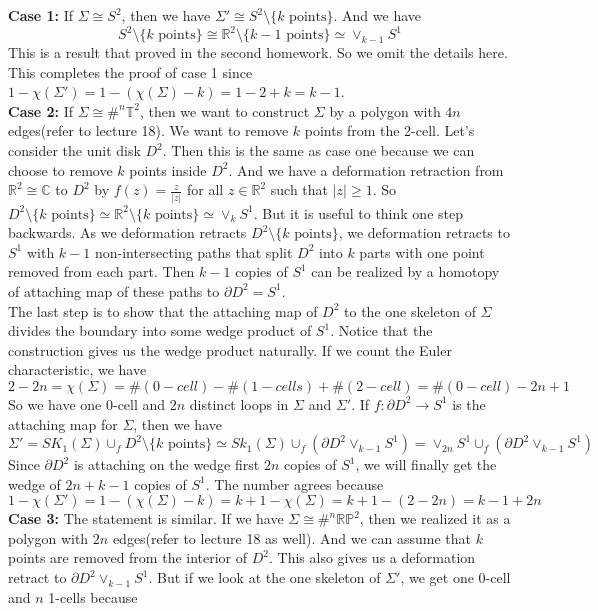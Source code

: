 \documentclass[12pt]{amsart}
\newcommand{\R}{\mathbb{R}}
\newcommand{\C}{\mathbb{C}}
\newcommand{\torus}{\mathbb{T}^2}
\newcommand{\rp}{\mathbb{RP}^2}
\begin{document}
\textbf{Case 1:} If $\Sigma\cong S^2$, then we have $\Sigma'\cong S^2\setminus\{k \text{ points}\}$. And we have 
\[S^2\setminus\{k \text{ points}\}\cong \R^2\setminus\{k-1 \text{ points}\}\simeq \vee_{k-1}S^1\]
This is a result that proved in the second homework. So we omit the details here. This completes the proof of case 1 since $1-\chi(\Sigma')=1-(\chi(\Sigma)-k)=1-2+k=k-1$.\\
\textbf{Case 2:} If $\Sigma \cong\#^n\torus$, then we want to construct $\Sigma$ by a polygon with $4n$ edges(refer to lecture 18). We want to remove $k$ points from the 2-cell. Let's consider the unit disk $D^2$. Then this is the same as case one because we can choose to remove $k$ points inside $D^2$. And we have a deformation retraction from $\R^2\cong \C$ to $D^2$ by $f(z)=\frac{z}{|z|}$ for all $z\in \R^2$ such that $|z|\geq 1$. So $D^2\setminus \{k\text{ points}\}\simeq \R^2\setminus\{k \text{ points}\}\simeq \vee_{k}S^1$. But it is useful to think one step backwards. As we deformation retracts $D^2\setminus \{k\text{ points}\}$, we deformation retracts to $S^1$ with $k-1$ non-intersecting paths that split $D^2$ into $k$ parts with one point removed from each part. Then $k-1$ copies of $S^1$ can be realized by a homotopy of attaching map of these paths to $\partial D^2=S^1$.\\
The last step is to show that the attaching map of $D^2$ to the one skeleton of $\Sigma$ divides the boundary into some wedge product of $S^1$. Notice that the construction gives us the wedge product naturally. If we count the Euler characteristic, we have 
\[2-2n=\chi(\Sigma)=\#(0-cell)-\#(1-cells)+\#(2-cell)=\#(0-cell)-2n+1\]
So we have one 0-cell and $2n$ distinct loops in $\Sigma$ and $\Sigma'$. If $f:\partial D^2\to S^1$ is the attaching map for $\Sigma$, then we have 
\[\Sigma'=SK_1(\Sigma)\cup_f D^2\setminus\{k \text{ points}\}\simeq Sk_1(\Sigma)\cup_f (\partial D^2 \vee_{k-1}S^1)=\vee_{2n}S^1\cup_f (\partial D^2 \vee_{k-1}S^1)\]
Since $\partial D^2$ is attaching on the wedge first $2n$ copies of $S^1$, we will finally get the wedge of $2n+k-1$ copies of $S^1$. The number agrees because 
\[1-\chi(\Sigma')=1-(\chi(\Sigma)-k)=k+1-\chi(\Sigma)=k+1-(2-2n)=k-1+2n\]
\textbf{Case 3:} The statement is similar. If we have $\Sigma\cong \#^n\rp$, then we realized it as a polygon with $2n$ edges(refer to lecture 18 as well). And we can assume that $k$ points are removed from the interior of $D^2$. This also gives us a deformation retract to $ \partial D^2 \vee_{k-1}S^1$. But if we look at the one skeleton of $\Sigma'$, we get one 0-cell and $n$ 1-cells because 
\end{document}
